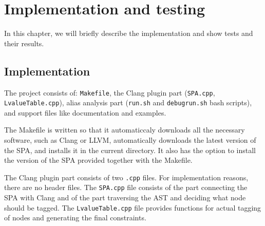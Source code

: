 \chapter{Implementation and testing}
In this chapter, we will briefly describe the implementation and show tests and their results.
\section{Implementation}
The project consists of: \verb|Makefile|, the Clang plugin part (\verb|SPA.cpp|, \verb|LvalueTable.cpp|), alias analysis part (\verb|run.sh| and \verb|debugrun.sh| bash scripts), and support files like documentation and examples.

The Makefile is written so that it automaticcaly downloads all the necessary software, such as Clang or LLVM, automatically downloads the latest version of the SPA, and installs it in the current directory. It also has the option to install the version of the SPA provided together with the Makefile.

The Clang plugin part consists of two \verb|.cpp| files. For implementation reasons, there are no header files. The \verb|SPA.cpp| file consists of the part connecting the SPA with Clang and of the part traversing the AST and deciding what node should be tagged. The \verb|LvalueTable.cpp| file provides functions for actual tagging of nodes and generating the final constraints.

